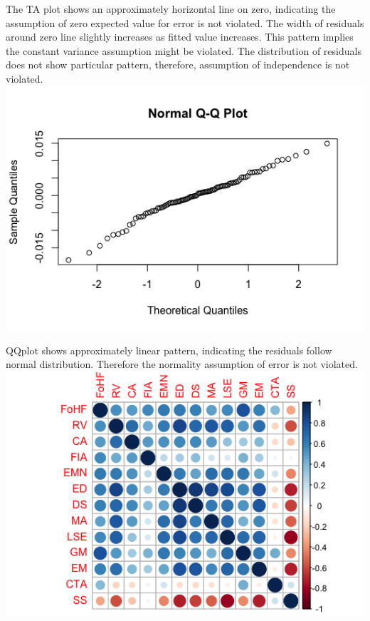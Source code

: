 \documentclass[11pt,letterpaper]{article}
\begin{document}
\noindent The TA plot shows an approximately horizontal line on zero, indicating the assumption of zero expected value for error is not violated. The width of residuals around zero line slightly increases as fitted value increases. This pattern implies the constant variance assumption might be violated. The distribution of residuals does not show particular pattern, therefore, assumption of independence is not violated.\\

\includegraphics[scale=0.7]{1-b-2.png}

\noindent QQplot shows approximately linear pattern, indicating the residuals follow normal distribution. Therefore the normality assumption of error is not violated. \\

\includegraphics[scale=0.7]{1-b-3.png}
\end{document}
